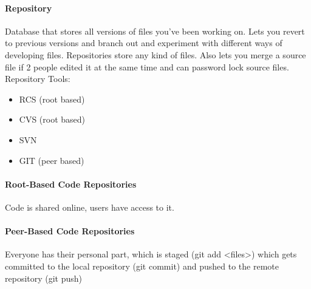 \documentclass[12 pt]{article}
\begin{document}
\paragraph{Repository} Database that stores all versions of files you've been working on. Lets you revert to previous versions and branch out and experiment with different ways of developing files. Repositories store any kind of files. Also lets you merge a source file if 2 people edited it at the same time and can password lock source files.
\\ Repository Tools:
\begin{itemize}
\item RCS (root based)
\item CVS (root based)
\item SVN
\item GIT (peer based)
\end{itemize}
\paragraph{Root-Based Code Repositories} Code is shared online, users have access to it.
\paragraph{Peer-Based Code Repositories} Everyone has their personal part, which is staged (git add <files>) which gets committed to the local repository (git commit) and pushed to the remote repository (git push)
\end{document}
